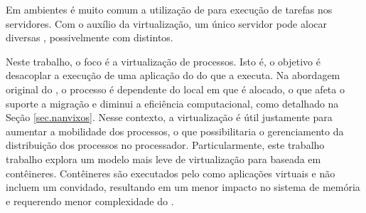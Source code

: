 Em ambientes \cloud é muito comum a utilização de \vms para execução de tarefas nos servidores. Com o auxílio da virtualização, um único servidor pode alocar diversas \vms, possivelmente com \sos distintos. 

Neste trabalho, o foco é a virtualização de processos. Isto é, o objetivo é desacoplar a execução de uma aplicação do \cluster do \lw que a executa. Na abordagem original do \nanvix, o processo é dependente do local em que é alocado, o que afeta o suporte a migração e diminui a eficiência computacional, como detalhado na Seção \ref{sec.nanvixos}. Nesse contexto, a virtualização é útil justamente para aumentar a mobilidade dos processos, o que possibilitaria o gerenciamento da distribuição dos processos no processador. Particularmente, este trabalho trabalho explora um modelo mais leve de virtualização para \lw baseada em contêineres. Contêineres são executados pelo \os como aplicações virtuais e não incluem um \os convidado, resultando em um menor impacto no sistema de memória e requerendo menor complexidade do \hardware \cite{thalheim2018cntr, sharma2016containers}.